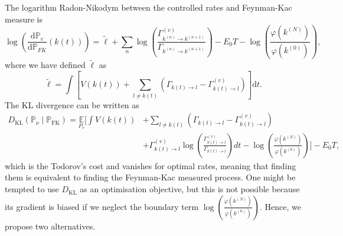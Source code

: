 The logarithm Radon-Nikodym between the controlled rates and Feynman-Kac measure is
\begin{equation}
	\label{eq:logrn-discrete}
	\log \left(\frac{\mathrm{d} \mathbb{P}_{v}}{\mathrm{d} \mathbb{P}_{F K}}(k(t))\right)
	= \tilde \ell
	+\sum_{n} \log \left(\frac{\Gamma_{k^{(n)} \rightarrow k^{(n+1)}}^{(v)}}{\Gamma_{k^{(n)} \rightarrow k^{(n+1)}}}\right)-E_{0} T-\log \left(\frac{\varphi(k^{(N)})}{\varphi(k^{(0)})}\right),
\end{equation}
where we have defined $\tilde \ell$ as
\begin{equation}
\tilde \ell = \int \left[V(k(t))+\sum_{l \neq k(t)}\left(\Gamma_{k(t) \rightarrow l}-\Gamma_{k(t) \rightarrow l}^{(v)}\right)\right] \mathrm{d}t.
\end{equation}
The KL divergence can be written as
\begin{equation}
	\begin{aligned}
		D_{\mathrm{KL}}\left(\mathbb{P}_{\nu} \mid \mathbb{P}_{\mathrm{FK}}\right) = \underset{P_{v}}{\mathbb{E}}\Bigg[\int V(k(t))&+\sum_{l \neq k(t)}\left(\Gamma_{k(t) \rightarrow l}-\Gamma_{k(t) \rightarrow l}^{(v)}\right)\\
		&+\Gamma_{k(t) \rightarrow l}^{(v)} \log \left(\frac{\Gamma_{k(t) \rightarrow l}^{(v)}}{\Gamma_{k(t) \rightarrow l}}\right) d t-\log \left(\frac{\varphi(k^{(N)})}{\varphi(k^{(0)})}\right)\Bigg]-E_{0} T,
	\end{aligned}
\end{equation}
which is the Todorov's cost and vanishes for optimal rates, meaning that finding them is equivalent to finding the Feynman-Kac measured process. One might be tempted to use $D_{\mathrm{KL}}$ as an optimisation objective, but this is not possible because its gradient is biased if we neglect the boundary term
$\log \left(\frac{\varphi(k^{(N)})}{\varphi(k^{(0)})}\right)$. Hence, we propose two alternatives.


